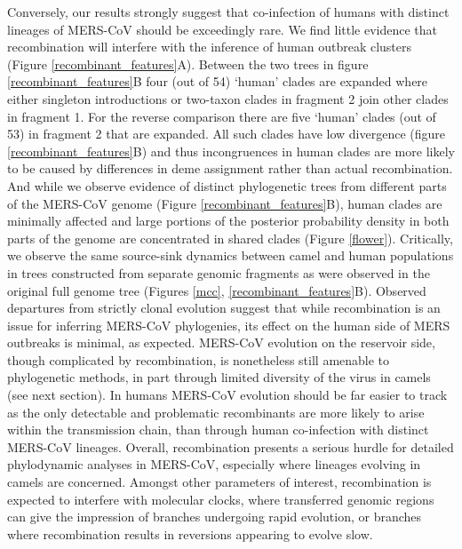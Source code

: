 \documentclass[11pt,oneside,letterpaper]{article}
\begin{document}
Conversely, our results strongly suggest that co-infection of humans with distinct lineages of MERS-CoV should be exceedingly rare.
We find little evidence that recombination will interfere with the inference of human outbreak clusters (Figure \ref{recombinant_features}A).
Between the two trees in figure \ref{recombinant_features}B four (out of 54) `human' clades are expanded where either singleton introductions or two-taxon clades in fragment 2 join other clades in fragment 1.
For the reverse comparison there are five `human' clades (out of 53) in fragment 2 that are expanded.
All such clades have low divergence (figure \ref{recombinant_features}B) and thus incongruences in human clades are more likely to be caused by differences in deme assignment rather than actual recombination.
And while we observe evidence of distinct phylogenetic trees from different parts of the MERS-CoV genome (Figure \ref{recombinant_features}B), human clades are minimally affected and large portions of the posterior probability density in both parts of the genome are concentrated in shared clades (Figure \ref{flower}).
Critically, we observe the same source-sink dynamics between camel and human populations in trees constructed from separate genomic fragments as were observed in the original full genome tree (Figures \ref{mcc}, \ref{recombinant_features}B).
Observed departures from strictly clonal evolution suggest that while recombination is an issue for inferring MERS-CoV phylogenies, its effect on the human side of MERS outbreaks is minimal, as expected.
MERS-CoV evolution on the reservoir side, though complicated by recombination, is nonetheless still amenable to phylogenetic methods, in part through limited diversity of the virus in camels (see next section).
In humans MERS-CoV evolution should be far easier to track as the only detectable and problematic recombinants are more likely to arise within the transmission chain, than through human co-infection with distinct MERS-CoV lineages.
Overall, recombination presents a serious hurdle for detailed phylodynamic analyses in MERS-CoV, especially where lineages evolving in camels are concerned.
Amongst other parameters of interest, recombination is expected to interfere with molecular clocks, where transferred genomic regions can give the impression of branches undergoing rapid evolution, or branches where recombination results in reversions appearing to evolve slow.
\end{document}
